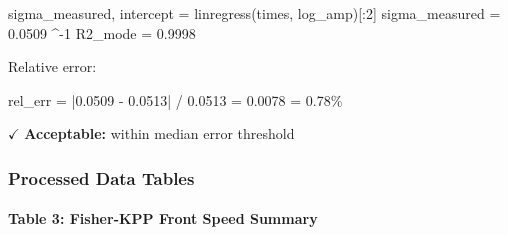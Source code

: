 \documentclass[
]{article}
\newenvironment{Shaded}{}{}
\newcommand{\DecValTok}[1]{\textcolor[rgb]{0.25,0.63,0.44}{#1}}
\newcommand{\FloatTok}[1]{\textcolor[rgb]{0.25,0.63,0.44}{#1}}
\newcommand{\NormalTok}[1]{#1}
\newcommand{\OperatorTok}[1]{\textcolor[rgb]{0.40,0.40,0.40}{#1}}
\begin{document}
\begin{Shaded}
\begin{Highlighting}[]
\NormalTok{sigma\_measured, intercept }\OperatorTok{=}\NormalTok{ linregress(times, log\_amp)[:}\DecValTok{2}\NormalTok{]}
\NormalTok{sigma\_measured }\OperatorTok{=} \FloatTok{0.0509}\NormalTok{ ^{-1}}
\NormalTok{R2\_mode }\OperatorTok{=} \FloatTok{0.9998}
\end{Highlighting}
\end{Shaded}

Relative error:

\begin{Shaded}
\begin{Highlighting}[]
\NormalTok{rel\_err }\OperatorTok{=} \OperatorTok{|}\FloatTok{0.0509} \OperatorTok{{-}} \FloatTok{0.0513}\OperatorTok{|} \OperatorTok{/} \FloatTok{0.0513} \OperatorTok{=} \FloatTok{0.0078} \OperatorTok{=} \FloatTok{0.78}\OperatorTok{\%}
\end{Highlighting}
\end{Shaded}

$\checkmark$ \textbf{Acceptable:} within median error threshold

\hypertarget{processed-data-tables}{%
\subsubsection{Processed Data Tables}\label{processed-data-tables}}

\hypertarget{table-3-fisher-kpp-front-speed-summary}{%
\paragraph{\texorpdfstring{\textbf{Table 3: Fisher-KPP Front Speed
Summary}}{Table 3: Fisher-KPP Front Speed Summary}}\label{table-3-fisher-kpp-front-speed-summary}}
\end{document}
